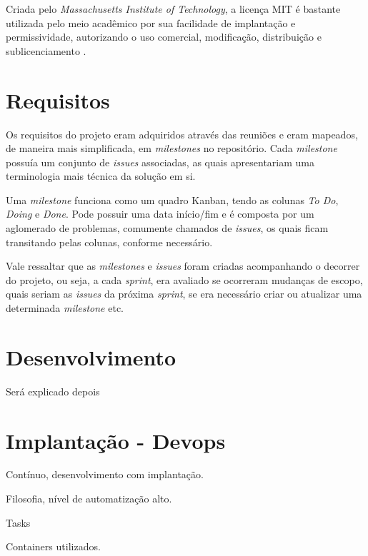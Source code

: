 Criada pelo \textit{Massachusetts Institute of Technology}, a licença MIT é bastante utilizada pelo meio acadêmico por sua facilidade de implantação e permissividade, autorizando o uso comercial, modificação, distribuição e sublicenciamento \cite{mit_license}.

\section{Requisitos}
Os requisitos do projeto eram adquiridos através das reuniões e eram mapeados, de maneira mais simplificada, em \textit{milestones} \cite{gitlab} no repositório. Cada \textit{milestone} possuía um conjunto de \textit{issues} associadas, as quais apresentariam uma terminologia mais técnica da solução em si.

Uma \textit{milestone} funciona como um quadro Kanban, tendo as colunas \textit{To Do}, \textit{Doing} e \textit{Done}. Pode possuir uma data início/fim e é composta por um aglomerado de problemas, comumente chamados de \textit{issues}, os quais ficam transitando pelas colunas, conforme necessário.

Vale ressaltar que as \textit{milestones} e \textit{issues} foram criadas acompanhando o decorrer do projeto, ou seja, a cada \textit{sprint}, era avaliado se ocorreram mudanças de escopo, quais seriam as \textit{issues} da próxima \textit{sprint}, se era necessário criar ou atualizar uma determinada \textit{milestone} etc.

\section{Desenvolvimento}
Será explicado depois

\section{Implantação - Devops}
Contínuo, desenvolvimento com implantação.

Filosofia, nível de automatização alto.

Tasks

Containers utilizados.

